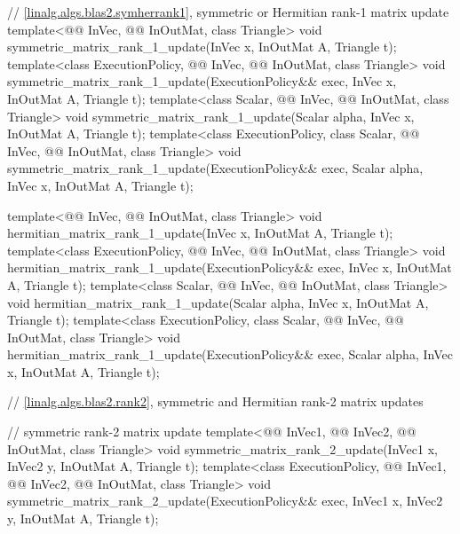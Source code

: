 \begin{codeblock}
{  // \ref{linalg.algs.blas2.symherrank1}, symmetric or Hermitian rank-1 matrix update
  template<@@ InVec, @@ InOutMat, class Triangle>
    void symmetric_matrix_rank_1_update(InVec x, InOutMat A, Triangle t);
  template<class ExecutionPolicy,
           @@ InVec, @@ InOutMat, class Triangle>
    void symmetric_matrix_rank_1_update(ExecutionPolicy&& exec,
                                        InVec x, InOutMat A, Triangle t);
  template<class Scalar, @@ InVec, @@ InOutMat, class Triangle>
    void symmetric_matrix_rank_1_update(Scalar alpha, InVec x, InOutMat A, Triangle t);
  template<class ExecutionPolicy,
           class Scalar, @@ InVec, @@ InOutMat, class Triangle>
    void symmetric_matrix_rank_1_update(ExecutionPolicy&& exec,
                                        Scalar alpha, InVec x, InOutMat A, Triangle t);

  template<@@ InVec, @@ InOutMat, class Triangle>
    void hermitian_matrix_rank_1_update(InVec x, InOutMat A, Triangle t);
  template<class ExecutionPolicy,
           @@ InVec, @@ InOutMat, class Triangle>
    void hermitian_matrix_rank_1_update(ExecutionPolicy&& exec,
                                        InVec x, InOutMat A, Triangle t);
  template<class Scalar, @@ InVec, @@ InOutMat, class Triangle>
    void hermitian_matrix_rank_1_update(Scalar alpha, InVec x, InOutMat A, Triangle t);
  template<class ExecutionPolicy,
           class Scalar, @@ InVec, @@ InOutMat, class Triangle>
    void hermitian_matrix_rank_1_update(ExecutionPolicy&& exec,
                                        Scalar alpha, InVec x, InOutMat A, Triangle t);

  // \ref{linalg.algs.blas2.rank2}, symmetric and Hermitian rank-2 matrix updates

  // symmetric rank-2 matrix update
  template<@@ InVec1, @@ InVec2,
           @@ InOutMat, class Triangle>
    void symmetric_matrix_rank_2_update(InVec1 x, InVec2 y, InOutMat A, Triangle t);
  template<class ExecutionPolicy, @@ InVec1, @@ InVec2,
           @@ InOutMat, class Triangle>
    void symmetric_matrix_rank_2_update(ExecutionPolicy&& exec,
                                        InVec1 x, InVec2 y, InOutMat A, Triangle t);

}
\end{codeblock}
